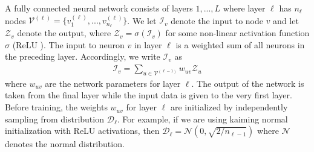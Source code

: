 \documentclass[10pt,twocolumn,letterpaper]{article}
\newcommand*{\V}{\mathcal{V}}
\newcommand*{\I}{\mathcal{I}}
\newcommand*{\Z}{\mathcal{Z}}
\begin{document}
A fully connected neural network consists of layers $1,...,L$ where layer $\ell$ has $n_\ell$ nodes $\V^{(\ell)} = \{v^{(\ell)}_1,..., v^{(\ell)}_{n_\ell}\}$. We let $\I_v$ denote the input to node $v$ and let $\Z_v$ denote the output, where $\Z_v = \sigma(\I_v)$ for some non-linear activation function $\sigma$ (\eg ReLU \cite{alexnet}). The input to neuron $v$ in layer $\ell$ is a weighted sum of all neurons in the preceding layer. Accordingly, we write $\I_v$ as
\begin{align} \label{eq:linear}
    \I_{v} = \sum_{u \in \V^{(\ell - 1)}} w_{uv} \Z_u
\end{align}
where $w_{uv}$ are the network parameters for layer $\ell$. The output of the network is taken from the final layer while the input data is given to the very first layer. Before training, the weights $w_{uv}$ for layer $\ell$ are initialized by independently sampling from distribution $\mathcal{D}_\ell$. For example, if we are using kaiming normal initialization \cite{kaiming-init} with ReLU activations, then $\mathcal{D}_\ell = \mathcal{N}\left(0, \sqrt{2/n_{\ell -1}} \right)$ where $\mathcal{N}$ denotes the normal distribution.
\end{document}
